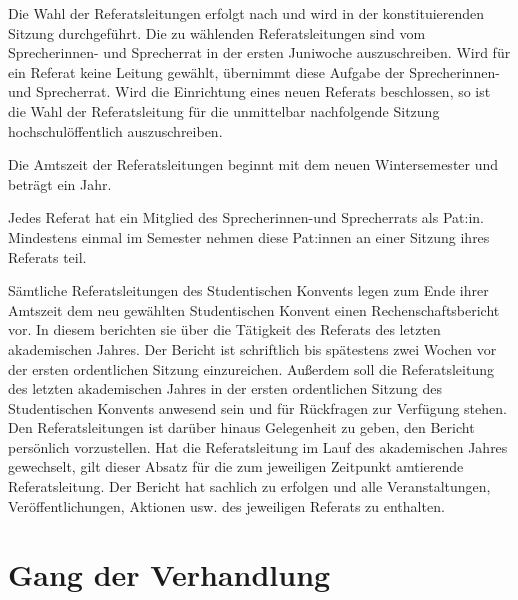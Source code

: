 \documentclass[10pt,a4paper]{scrartcl}
\begin{document}
\begin{contract}
Die Wahl der Referatsleitungen erfolgt nach und wird in der konstituierenden
Sitzung durchgeführt. Die zu wählenden Referatsleitungen sind vom Sprecherinnen-
und Sprecherrat in der ersten Juniwoche auszuschreiben. Wird für ein Referat
keine Leitung gewählt, übernimmt diese Aufgabe der Sprecherinnen- und
Sprecherrat. Wird die Einrichtung eines neuen Referats beschlossen, so ist die
Wahl der Referatsleitung für die unmittelbar nachfolgende Sitzung
hochschulöffentlich auszuschreiben.

Die Amtszeit der Referatsleitungen beginnt mit dem neuen
Wintersemester und beträgt ein Jahr.

Jedes Referat hat ein Mitglied des Sprecherinnen-und Sprecherrats
als Pat:in. Mindestens einmal im Semester nehmen diese Pat:innen an
einer Sitzung ihres Referats teil.
   
Sämtliche Referatsleitungen des Studentischen Konvents legen zum Ende
ihrer Amtszeit dem neu gewählten Studentischen Konvent einen
Rechenschaftsbericht vor. In diesem berichten sie über die Tätigkeit
des Referats des letzten akademischen Jahres. Der Bericht ist
schriftlich bis spätestens zwei Wochen vor der ersten ordentlichen
Sitzung einzureichen. Außerdem soll die Referatsleitung des letzten
akademischen Jahres in der ersten ordentlichen Sitzung des
Studentischen Konvents anwesend sein und für Rückfragen zur Verfügung
stehen. Den Referatsleitungen ist darüber hinaus Gelegenheit zu geben,
den Bericht persönlich vorzustellen. Hat die Referatsleitung im Lauf
des akademischen Jahres gewechselt, gilt dieser Absatz für die zum
jeweiligen Zeitpunkt amtierende Referatsleitung. Der Bericht hat
sachlich zu erfolgen und alle Veranstaltungen, Veröffentlichungen,
Aktionen usw. des jeweiligen Referats zu enthalten.

\end{contract}


\section{Gang der Verhandlung}\label{gang-der-verhandlung}
\end{document}
